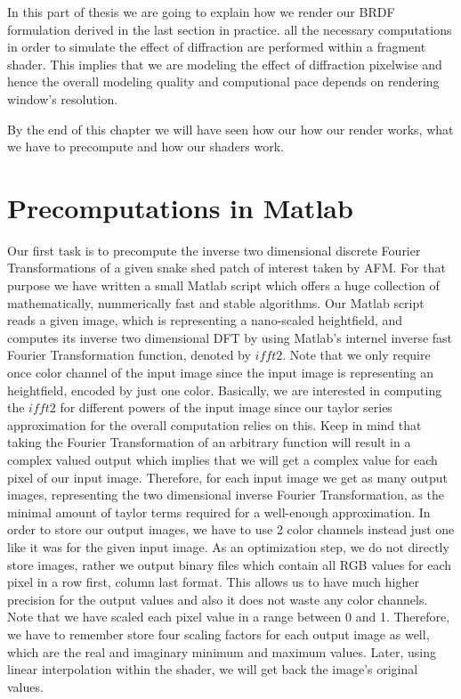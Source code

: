 In this part of thesis we are going to explain how we render our BRDF formulation derived in the last section in practice. all the necessary computations in order to simulate the effect of diffraction are performed within a fragment shader. This implies that we are modeling the effect of diffraction pixelwise and hence the overall modeling quality and computional pace depends on rendering window's resolution.

By the end of this chapter we will have seen how our how our render works, what we have to precompute and how our shaders work. 


\section{Precomputations in Matlab}
Our first task is to precompute the inverse two dimensional discrete Fourier Transformations of a given snake shed patch of interest taken by AFM. For that purpose we have written a small Matlab script which offers a huge collection of mathematically, nummerically fast and stable algorithms. Our Matlab script reads a given image, which is representing a nano-scaled heightfield, and computes its inverse two dimensional DFT by using Matlab's internel inverse fast Fourier Transformation function, denoted by $ifft2$. Note that we only require once color channel of the input image since the input image is representing an heightfield, encoded by just one color. Basically, we are interested in computing the $ifft2$ for different powers of the input image since our taylor series approximation for the overall computation relies on this. Keep in mind that taking the Fourier Transformation of an arbitrary function will result in a complex valued output which implies that we will get a complex value for each pixel of our input image. Therefore, for each input image we get as many output images, representing the two dimensional inverse Fourier Transformation, as the minimal amount of taylor terms required for a well-enough approximation. In order to store our output images, we have to use 2 color channels instead just one like it was for the given input image. As an optimization step, we do not directly store images, rather we output binary files which contain all RGB values for each pixel in a row first, column last format. This allows us to have much higher precision for the output values and also it does not waste any color channels. Note that we have scaled each pixel value in a range between 0 and 1. Therefore, we have to remember store four scaling factors for each output image as well, which are the real and imaginary minimum and maximum values. Later, using linear interpolation within the shader, we will get back the image's original values. 

